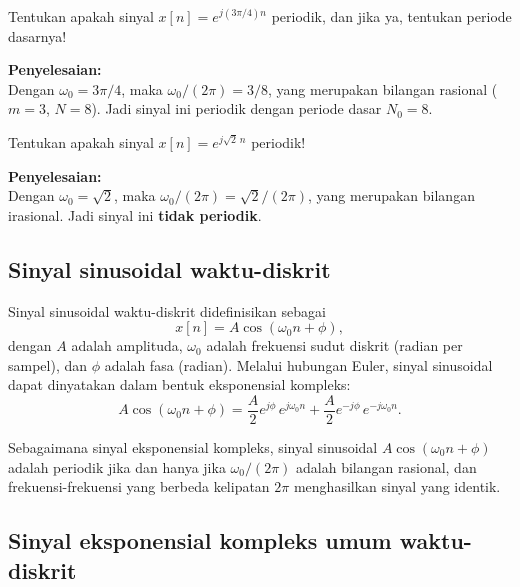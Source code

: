 \begin{exmp}
Tentukan apakah sinyal $x[n] = e^{j(3\pi/4)n}$ periodik, dan jika ya, tentukan periode dasarnya!

\textbf{Penyelesaian:}\\
Dengan $\omega_0 = 3\pi/4$, maka $\omega_0/(2\pi) = 3/8$, yang merupakan bilangan rasional ($m=3$, $N=8$). Jadi sinyal ini periodik dengan periode dasar $N_0 = 8$.
\end{exmp}

\begin{exmp}
Tentukan apakah sinyal $x[n] = e^{j\sqrt{2}\,n}$ periodik!

\textbf{Penyelesaian:}\\
Dengan $\omega_0 = \sqrt{2}$, maka $\omega_0/(2\pi) = \sqrt{2}/(2\pi)$, yang merupakan bilangan irasional. Jadi sinyal ini \textbf{tidak periodik}.
\end{exmp}

\subsection{Sinyal sinusoidal waktu-diskrit}

Sinyal sinusoidal waktu-diskrit didefinisikan sebagai
\begin{equation}
x[n] = A\cos(\omega_0 n + \phi),
\end{equation}
dengan $A$ adalah amplituda, $\omega_0$ adalah frekuensi sudut diskrit (radian per sampel), dan $\phi$ adalah fasa (radian). Melalui hubungan Euler, sinyal sinusoidal dapat dinyatakan dalam bentuk eksponensial kompleks:
\begin{equation}
A\cos(\omega_0 n + \phi) = \frac{A}{2}e^{j\phi}\,e^{j\omega_0 n} + \frac{A}{2}e^{-j\phi}\,e^{-j\omega_0 n}.
\end{equation}

Sebagaimana sinyal eksponensial kompleks, sinyal sinusoidal $A\cos(\omega_0 n + \phi)$ adalah periodik jika dan hanya jika $\omega_0/(2\pi)$ adalah bilangan rasional, dan frekuensi-frekuensi yang berbeda kelipatan $2\pi$ menghasilkan sinyal yang identik.

\subsection{Sinyal eksponensial kompleks umum waktu-diskrit}

